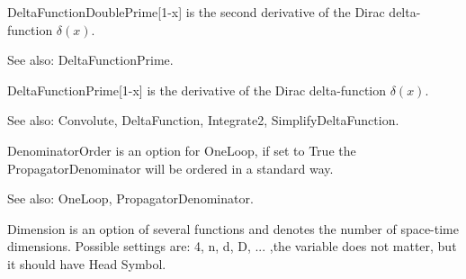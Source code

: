 






 DeltaFunctionDoublePrime[1-x] is the second derivative of the Dirac delta-function \(\delta (x)\).

See also: DeltaFunctionPrime.



 DeltaFunctionPrime[1-x] is the derivative of the Dirac delta-function \(\delta (x)\).

See also: Convolute, DeltaFunction, Integrate2, SimplifyDeltaFunction.










DenominatorOrder is an option for OneLoop, if set to True the PropagatorDenominator will be ordered in a standard way.

See also: OneLoop, PropagatorDenominator.



Dimension is an option of several functions and denotes the number of space-time dimensions. Possible settings are: 4, n, d, D, ... ,the
  variable does not matter, but it should have Head Symbol.

